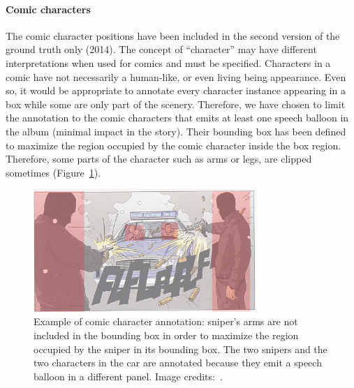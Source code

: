 
\paragraph{Comic characters} %
\label{par:comic_characters}
The comic character positions have been included in the second version of the ground truth only (2014).
The concept of ``character'' may have different interpretations when used for comics and must be specified.
Characters in a comic have not necessarily a human-like, or even living being appearance.
Even so, it would be appropriate to annotate every character instance appearing in a box while some are only part of the scenery.
Therefore, we have chosen to limit the annotation to the comic characters that emits at least one speech balloon in the album (minimal impact in the story).
Their bounding box has been defined to maximize the region occupied by the comic character inside the box region.
Therefore, some parts of the character such as arms or legs, are clipped sometimes (Figure~\ref{fig:gt:segCharacter}).

\begin{figure}[h!]
\begin{center}
\includegraphics[width=0.75\textwidth]{segCharacter.png}
\caption[Comic character position annotation]{Example of comic character annotation: sniper's arms are not included in the bounding box in order to maximize the region occupied by the sniper in its bounding box. The two snipers and the two characters in the car are annotated because they emit a speech balloon in a different panel. Image credits:~\cite{Boston10}.}
\label{fig:gt:segCharacter}
\end{center}
\end{figure}




